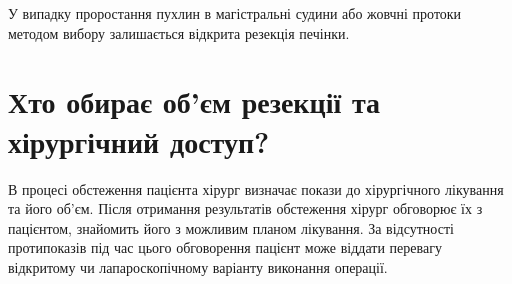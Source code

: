 У випадку проростання пухлин в магістральні судини або жовчні протоки методом вибору залишається відкрита резекція печінки.

\section{Хто обирає об'єм резекції та хірургічний доступ?}
В процесі обстеження пацієнта хірург визначає покази до хірургічного лікування та його об'єм. Після отримання результатів обстеження хірург обговорює їх з пацієнтом, знайомить його з можливим планом лікування. За відсутності протипоказів під час цього обговорення пацієнт може віддати перевагу відкритому чи лапароскопічному варіанту виконання операції.
